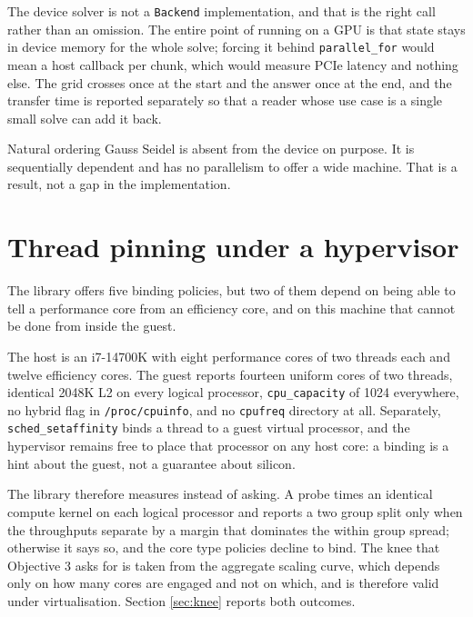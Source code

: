 The device solver is not a \texttt{Backend} implementation, and that is the right
call rather than an omission. The entire point of running on a GPU is that state
stays in device memory for the whole solve; forcing it behind
\texttt{parallel\_for} would mean a host callback per chunk, which would measure
PCIe latency and nothing else. The grid crosses once at the start and the answer
once at the end, and the transfer time is reported separately so that a reader
whose use case is a single small solve can add it back.

Natural ordering Gauss Seidel is absent from the device on purpose. It is
sequentially dependent and has no parallelism to offer a wide machine. That is a
result, not a gap in the implementation.

\section{Thread pinning under a hypervisor}

The library offers five binding policies, but two of them depend on being able
to tell a performance core from an efficiency core, and on this machine that
cannot be done from inside the guest.

The host is an i7-14700K with eight performance cores of two threads each and
twelve efficiency cores. The guest reports fourteen uniform cores of two
threads, identical 2048K L2 on every logical processor, \texttt{cpu\_capacity} of
1024 everywhere, no hybrid flag in \texttt{/proc/cpuinfo}, and no
\texttt{cpufreq} directory at all. Separately, \texttt{sched\_setaffinity} binds
a thread to a guest virtual processor, and the hypervisor remains free to place
that processor on any host core: a binding is a hint about the guest, not a
guarantee about silicon.

The library therefore measures instead of asking. A probe times an identical
compute kernel on each logical processor and reports a two group split only when
the throughputs separate by a margin that dominates the within group spread;
otherwise it says so, and the core type policies decline to bind. The knee that
Objective 3 asks for is taken from the aggregate scaling curve, which depends
only on how many cores are engaged and not on which, and is therefore valid
under virtualisation. Section \ref{sec:knee} reports both outcomes.
